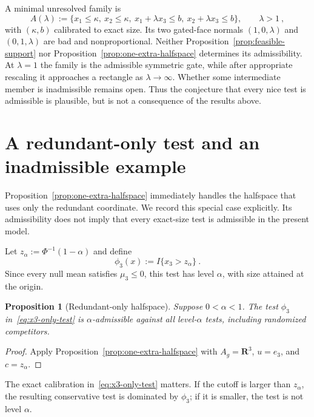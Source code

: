 \documentclass[12pt]{article}
\newtheorem{proposition}{Proposition}
\theoremstyle{remark}
\begin{document}
A minimal unresolved family is
\begin{equation}\label{eq:two-bad-facet-family}
A(\lambda)
:=
\{x_1\le\kappa,\ x_2\le\kappa,\
x_1+\lambda x_3\le b,\ x_2+\lambda x_3\le b\},
\qquad \lambda>1~,
\end{equation}
with $(\kappa,b)$ calibrated to exact size.  Its two gated-face normals
$(1,0,\lambda)$ and $(0,1,\lambda)$ are bad and nonproportional.  Neither
Proposition~\ref{prop:feasible-support} nor
Proposition~\ref{prop:one-extra-halfspace} determines its admissibility.
At $\lambda=1$ the family is the admissible symmetric gate, while after
appropriate rescaling it approaches a rectangle as $\lambda\to\infty$.
Whether some intermediate member is inadmissible remains open.  Thus the
conjecture that every nice test is admissible is plausible, but is not a
consequence of the results above.

\section{A redundant-only test and an inadmissible example}

Proposition~\ref{prop:one-extra-halfspace} immediately handles the halfspace
that uses only the redundant coordinate.  We record this special case
explicitly.  Its admissibility does not imply that every exact-size test is
admissible in the present model.

Let $z_\alpha:=\Phi^{-1}(1-\alpha)$ and define
\begin{equation}\label{eq:x3-only-test}
\phi_3(x):=I\{x_3>z_\alpha\}~.
\end{equation}
Since every null mean satisfies $\mu_3\le0$, this test has level $\alpha$,
with size attained at the origin.

\begin{proposition}[Redundant-only halfspace]
\label{prop:x3-only-admissible}
Suppose $0<\alpha<1$.  The test $\phi_3$ in~\eqref{eq:x3-only-test} is
$\alpha$-admissible against all level-$\alpha$ tests, including randomized
competitors.
\end{proposition}

\begin{proof}
Apply Proposition~\ref{prop:one-extra-halfspace} with
$A_g=\mathbf R^3$, $u=e_3$, and $c=z_\alpha$.
\end{proof}

The exact calibration in~\eqref{eq:x3-only-test} matters.  If the cutoff is
larger than $z_\alpha$, the resulting conservative test is dominated by
$\phi_3$; if it is smaller, the test is not level $\alpha$.
\end{document}
